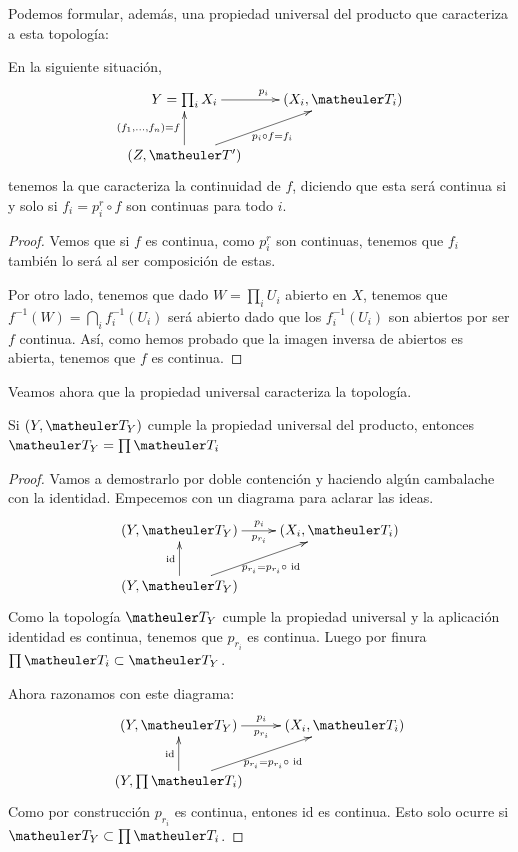 Podemos formular, además, una propiedad universal del producto que caracteriza a esta topología:

\begin{lem}
	En la siguiente situación,
	\[\xymatrix{
		Y=\prod_i X_i \ar[r]^{p_i} & 
		(X_i,\T_i) \\
		(Z,\T') \ar[u]^{(f_1,\dots,f_n)=f} \ar[ru]_{p_i\circ f=f_i} &
	}\]
	tenemos la  que caracteriza la continuidad de $f$, diciendo que esta será continua si y solo si $f_i=p_i^r\circ f$ son continuas para todo $i$.
	
	\begin{proof}
		Vemos que si $f$ es continua, como $p_i^r$ son continuas, tenemos que $f_i$ también lo será al ser composición de estas.
		
		Por otro lado, tenemos que dado $W=\prod_iU_i$ abierto en $X$, tenemos que $f^{-1}(W)=\bigcap_i f_i^{-1}(U_i)$ será abierto dado que los $f_i^{-1}(U_i)$ son abiertos por ser $f$ continua. Así, como hemos probado que la imagen inversa de abiertos es abierta, tenemos que $f$ es continua.
	\end{proof}
\end{lem}

Veamos ahora que la propiedad universal caracteriza la topología.

\begin{prop}
	Si $(Y,\T_Y)$ cumple la propiedad universal del producto, entonces $\T_Y = \prod\T_i $
\end{prop}
\begin{proof}
	Vamos a demostrarlo por doble contención y haciendo algún cambalache con la identidad.
	Empecemos con un diagrama para aclarar las ideas.
	\[\xymatrix{
		(Y,\T_Y) \ar[r]_{p_{r_i}}^{p_i} & 
		(X_i,\T_i) \\
		(Y,\T_Y) \ar[u]^{\text{id}} \ar[ru]_{p_{r_i} = p_{r_i} \circ \text{ id}} &
	}\]
	Como la topología $\T_Y$ cumple la propiedad universal y la aplicación identidad es continua, tenemos que $p_{r_i}$ es continua. Luego por finura $ \prod\T_i \subset \T_Y$.
	
	Ahora razonamos con este diagrama:
	\[\xymatrix{
		(Y,\T_Y) \ar[r]_{p_{r_i}}^{p_i} & 
		(X_i,\T_i) \\
		(Y,\prod\T_i) \ar[u]^{\text{id}} \ar[ru]_{p_{r_i} = p_{r_i} \circ \text{ id}} &
	}\]	
	Como por construcción $p_{r_i}$ es continua, entones id es continua. Esto solo ocurre si $\T_Y \subset \prod\T_i$. 	
\end{proof}

